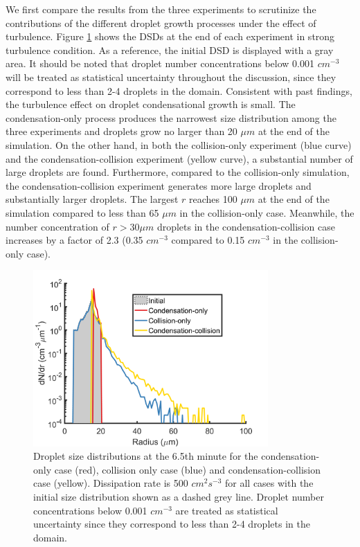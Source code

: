 We first compare the results from the three experiments to scrutinize the contributions of the different droplet growth processes under the effect of turbulence. Figure \ref{fig01} shows the DSDs at the end of each experiment in strong turbulence condition. As a reference, the initial DSD is displayed with a gray area. It should be noted that droplet number concentrations below 0.001 $cm^{-3}$ will be treated as statistical uncertainty throughout the discussion, since they correspond to less than 2-4 droplets in the domain. Consistent with past findings, the turbulence effect on droplet condensational growth is small. The condensation-only process produces the narrowest size distribution among the three experiments and droplets grow no larger than 20 $\mu m$ at the end of the simulation. On the other hand, in both the collision-only experiment (blue curve) and the condensation-collision experiment (yellow curve), a substantial number of large droplets are found. Furthermore, compared to the collision-only simulation, the condensation-collision experiment generates more large droplets and substantially larger droplets. The largest $r$ reaches 100 $\mu m$ at the end of the simulation compared to less than 65 $\mu m$ in the collision-only case. Meanwhile, the number concentration of $r > 30 \mu m$ droplets in the condensation-collision case increases by a factor of 2.3 (0.35 $cm^{-3}$ compared to 0.15 $cm^{-3}$ in the collision-only case). 

\begin{figure}[ht]
\centering
\includegraphics[width=0.8\textwidth]{Figures/Chap4/DSD_end.png}
\caption{Droplet size distributions at the 6.5th minute for the condensation-only case (red), collision only case (blue) and condensation-collision case (yellow). Dissipation rate is 500 $cm^2 s^{-3}$ for all cases with the initial size distribution shown as a dashed grey line. Droplet number concentrations below 0.001 $cm^{-3}$ are treated as statistical uncertainty since they correspond to less than 2-4 droplets in the domain.}\label{fig01}
\end{figure}

